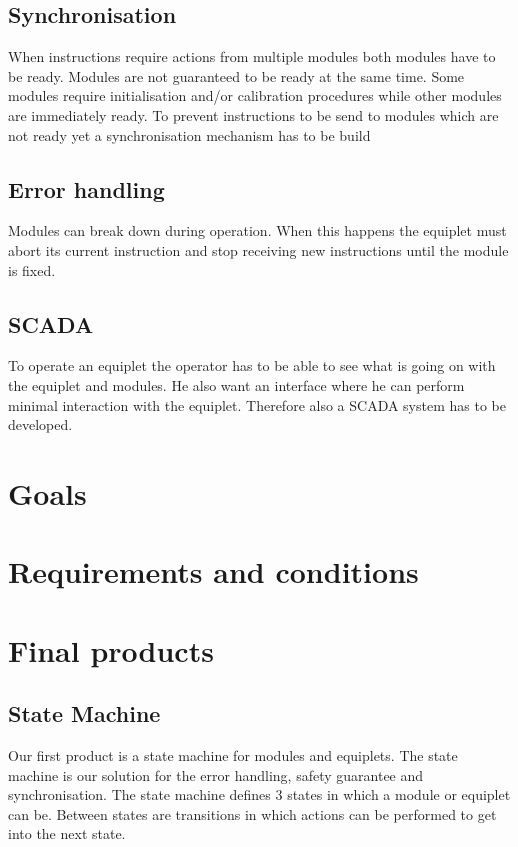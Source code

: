 \documentclass[12pt,a4paper]{report}
\begin{document}
\subsection{Synchronisation}
When instructions require actions from multiple modules both modules have to be ready.
Modules are not guaranteed to be ready at the same time. Some modules require initialisation  and/or calibration procedures while other modules are immediately ready.
To prevent instructions to be send to modules which are not ready yet a synchronisation mechanism has to be build

\subsection{Error handling}
Modules can break down during operation. When this happens the equiplet must abort its current instruction and stop receiving new instructions until the module is fixed.

\subsection{SCADA}
To operate an equiplet the operator has to be able to see what is going on with the equiplet and modules. He also want an interface where he can perform minimal interaction with the equiplet. Therefore also a SCADA system has to be developed.

\section{Goals}

\section{Requirements and conditions}

\section{Final products}
\subsection{State Machine}
Our first product is a state machine for modules and equiplets.
The state machine is our solution for the error handling, safety guarantee and synchronisation.
The state machine defines 3 states in which a module or equiplet can be.
Between states are transitions in which actions can be performed to get into the next state.
\end{document}
